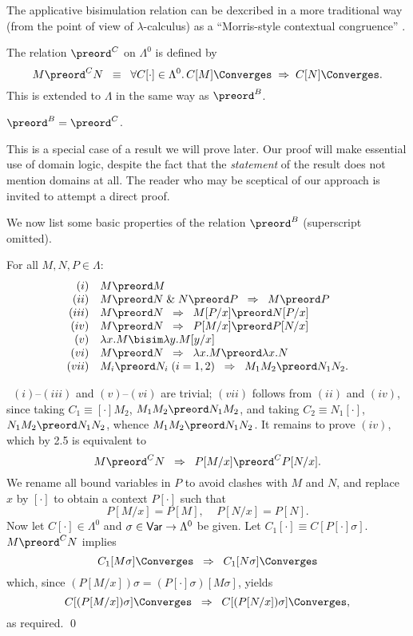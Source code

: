 The applicative bisimulation relation can be dexcribed in a more traditional 
way (from the point of view of $\lambda$-calculus) as a ``Morris-style 
contextual congruence'' \cite{Mor68,Plo77,Mil77,Bar}.
\begin{definition}
{\rm The relation $\preord^{C}$ on $\Lambda^{0}$ is defined by
\[ M \preord^{C} N \;\; \equiv \;\; \forall C[\cdot ] \in \Lambda^{0}. \, C[M] \Converges \; \Rightarrow \; C[N] \Converges . \]
This is extended to $\Lambda$ in the same way as $\preord^{B}$.}
\end{definition}
\begin{proposition}
\label{cont}
${\preord^{B}} = {\preord^{C}}$.
\end{proposition}
This is a special case of a result we will prove later. Our proof will make essential use of domain logic, despite the fact that the {\em statement} of the result does not mention domains at all. The reader who may be sceptical of our approach is invited to attempt a direct proof.

We now list some basic properties of the relation $\preord^{B}$ (superscript omitted).
\begin{proposition}
\label{lazycong}
For all $M, N, P \in \Lambda$:
\[\begin{array}{rl}
(i) & M \preord M \\
(ii) & M \preord N \; \& \; N \preord P \;\; \Rightarrow \;\; M \preord P \\
(iii) & M \preord N \;\; \Rightarrow \;\; M[P/x] \preord N[P/x] \\
(iv) & M \preord N \;\; \Rightarrow \;\; P[M/x] \preord P[N/x] \\
(v) & \lambda x . M \bisim \lambda y . M[y/x] \\
(vi) & M \preord N \;\; \Rightarrow \;\; \lambda x . M \preord \lambda x . N \\
(vii) & M_{i} \preord N_{i} \; (i=1,2) \;\; \Rightarrow \;\; M_{1}M_{2} \preord N_{1}N_{2} .
\end{array} \]
\end{proposition}

\proof\ $(i)$--$(iii)$ and $(v)$--$(vi)$ are trivial; 
$(vii)$ follows from $(ii)$ and $(iv)$, since taking $C_{1} \equiv [\cdot ]M_{2}$, 
$M_{1}M_{2} \preord N_{1}M_{2}$, and taking $C_{2} \equiv N_{1}[\cdot ]$, $N_{1}M_{2} \preord N_{1}N_{2}$, whence $M_{1}M_{2} \preord N_{1}N_{2}$. It remains to prove $(iv)$, which by 2.5 is equivalent to
\[ M \preord^{C} N \;\; \Rightarrow \;\; P[M/x] \preord^{C} P[N/x]. \]
We rename all bound variables in $P$ to avoid clashes with $M$ and $N$, 
and replace $x$ by $[\cdot ]$ to obtain a context $P[\cdot ]$ such that
\[ P[M/x] = P[M], \;\;\;\; P[N/x] = P[N]. \]
Now let $C[\cdot ] \in \Lambda^{0}$ and $\sigma \in {\sf Var} \rightarrow \Lambda^{0}$ be given. 
Let $C_{1}[\cdot ] \equiv C[P[\cdot ] \sigma ]$. $M \preord^{C} N$ implies
\[ C_{1}[M \sigma ] \Converges \;\; \Rightarrow \;\; C_{1}[N \sigma ] \Converges \]
which, since $(P[M/x])\sigma = (P[\cdot ] \sigma )[M \sigma ]$, yields
\[ C[(P[M/x]) \sigma ] \Converges \;\; \Rightarrow \;\; C[(P[N/x]) \sigma ] \Converges , \]
as required. \qed


